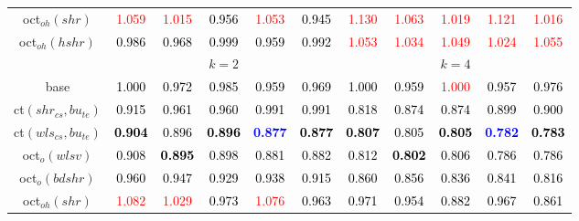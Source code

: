 \begin{tabular}[t]{c|>{}cccc>{}c|ccccc}
oct$_{oh}(shr)$ & \textcolor{red}{1.059} & \textcolor{red}{1.015} & \textcolor{black}{0.956} & \textcolor{red}{1.053} & \textcolor{black}{0.945} & \textcolor{red}{1.130} & \textcolor{red}{1.063} & \textcolor{red}{1.019} & \textcolor{red}{1.121} & \textcolor{red}{1.016}\\
oct$_{oh}(hshr)$ & \textcolor{black}{0.986} & \textcolor{black}{0.968} & \textcolor{black}{0.999} & \textcolor{black}{0.959} & \textcolor{black}{0.992} & \textcolor{red}{1.053} & \textcolor{red}{1.034} & \textcolor{red}{1.049} & \textcolor{red}{1.024} & \textcolor{red}{1.055}\\
\addlinespace[0.3em]
\multicolumn{1}{c}{} & \multicolumn{5}{c}{\textbf{$k = 2$}} & \multicolumn{5}{c}{\textbf{$k = 4$}}\\
base & \textcolor{black}{1.000} & \textcolor{black}{0.972} & \textcolor{black}{0.985} & \textcolor{black}{0.959} & \textcolor{black}{0.969} & \textcolor{black}{1.000} & \textcolor{black}{0.959} & \textcolor{red}{1.000} & \textcolor{black}{0.957} & \textcolor{black}{0.976}\\
ct$(shr_{cs}, bu_{te})$ & \textcolor{black}{0.915} & \textcolor{black}{0.961} & \textcolor{black}{0.960} & \textcolor{black}{0.991} & \textcolor{black}{0.991} & \textcolor{black}{0.818} & \textcolor{black}{0.874} & \textcolor{black}{0.874} & \textcolor{black}{0.899} & \textcolor{black}{0.900}\\
ct$(wls_{cs}, bu_{te})$ & \textcolor{black}{\textbf{0.904}} & \textcolor{black}{0.896} & \textcolor{black}{\textbf{0.896}} & \textcolor{blue}{\textbf{0.877}} & \textcolor{black}{\textbf{0.877}} & \textcolor{black}{\textbf{0.807}} & \textcolor{black}{0.805} & \textcolor{black}{\textbf{0.805}} & \textcolor{blue}{\textbf{0.782}} & \textcolor{black}{\textbf{0.783}}\\
oct$_o(wlsv)$ & \textcolor{black}{0.908} & \textcolor{black}{\textbf{0.895}} & \textcolor{black}{0.898} & \textcolor{black}{0.881} & \textcolor{black}{0.882} & \textcolor{black}{0.812} & \textcolor{black}{\textbf{0.802}} & \textcolor{black}{0.806} & \textcolor{black}{0.786} & \textcolor{black}{0.786}\\
oct$_o(bdshr)$ & \textcolor{black}{0.960} & \textcolor{black}{0.947} & \textcolor{black}{0.929} & \textcolor{black}{0.938} & \textcolor{black}{0.915} & \textcolor{black}{0.860} & \textcolor{black}{0.856} & \textcolor{black}{0.836} & \textcolor{black}{0.841} & \textcolor{black}{0.816}\\
oct$_{oh}(shr)$ & \textcolor{red}{1.082} & \textcolor{red}{1.029} & \textcolor{black}{0.973} & \textcolor{red}{1.076} & \textcolor{black}{0.963} & \textcolor{black}{0.971} & \textcolor{black}{0.954} & \textcolor{black}{0.882} & \textcolor{black}{0.967} & \textcolor{black}{0.861}\\

\end{tabular}
